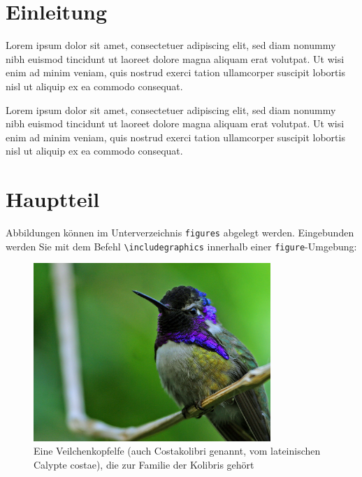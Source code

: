 
\chapter{Einleitung}
\label{chp:Einleitung}
Lorem ipsum dolor sit amet, consectetuer adipiscing elit, sed diam nonummy nibh euismod tincidunt ut laoreet dolore magna aliquam erat volutpat. Ut wisi enim ad minim veniam, quis nostrud exerci tation ullamcorper suscipit lobortis nisl ut aliquip ex ea commodo consequat. \cite{Konak2006,Sailer2013}

Lorem ipsum dolor sit amet, consectetuer adipiscing elit, sed diam nonummy nibh euismod tincidunt ut laoreet dolore magna aliquam erat volutpat. Ut wisi enim ad minim veniam, quis nostrud exerci tation ullamcorper suscipit lobortis nisl ut aliquip ex ea commodo consequat.
 
 
 \chapter{Hauptteil}
 \label{sec:Hauptteil}
 
 Abbildungen können im Unterverzeichnis \texttt{figures} abgelegt werden.
 Eingebunden werden Sie mit dem Befehl \texttt{\textbackslash includegraphics} innerhalb
 einer \texttt{figure}-Umgebung:
 \begin{figure}[htb]
 	\centering
 	\includegraphics[width=0.8\textwidth]{figures/Hummingbird.jpg}
 	\caption{Eine Veilchenkopfelfe (auch Costakolibri genannt, vom lateinischen Calypte costae), die zur Familie der Kolibris gehört \cite{Kolibri}}
 	\label{fig:kolibri}
 \end{figure}
 
